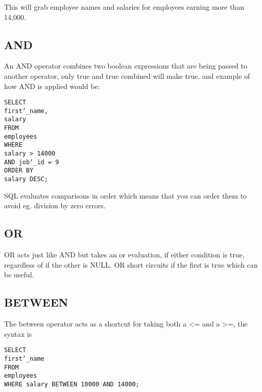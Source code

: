 \documentclass[10pt, english]{article}
\begin{document}
This will grab employee names and salaries for employees 
earning more than 14,000.

\subsection{AND}
An AND operator combines two boolean expressions that are being passed to another operator, only
true and true combined will make true. and example of how AND is applied would be:

\texttt{SELECT\\
\hspace*{10pt} first\char`_name,\\
\hspace*{10pt} salary \\
FROM \\
\hspace*{10pt} employees \\
WHERE \\
\hspace*{10pt} salary > 14000 \\
\hspace*{10pt} AND job\char`_id = 9 \\
ORDER BY \\
\hspace*{10pt} salary DESC;
}

SQL evaluates comparisons in order which means that you can order them to 
avoid eg. division by zero errors.

\subsection{OR}
OR acts just like AND but takes an or evaluation, if either condition is true, regardless of 
if the other is NULL. OR short circuits if the first is true which can be useful.

\subsection{BETWEEN}
The between operator acts as a shortcut for taking both a 
<= and a >=, the syntax is 

\texttt{SELECT\\
\hspace*{10pt} first\char`_name \\
FROM \\
\hspace*{10pt} employees \\
WHERE salary BETWEEN 10000 AND 14000;
}
\end{document}
